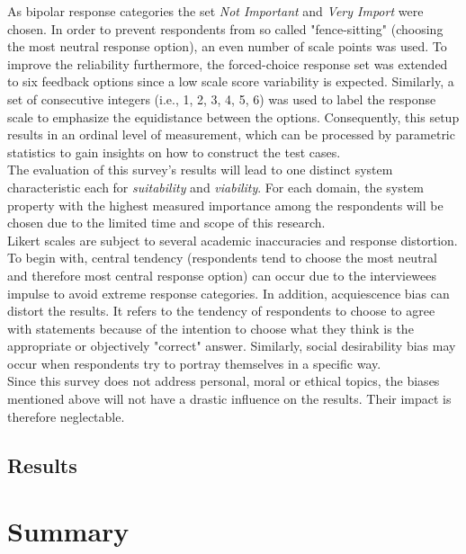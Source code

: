 As bipolar response categories the set \textit{Not Important} and \textit{Very Import} were chosen. In order to prevent respondents from so called "fence-sitting" (choosing the most neutral response option), an even number of scale points was used. To improve the reliability furthermore, the forced-choice response set was extended to six feedback options since a low scale score variability is expected.\autocite{Brill2008LikertScale} Similarly, a set of consecutive integers (i.e., 1, 2, 3, 4, 5, 6) was used to label the response scale to emphasize the equidistance between the options. Consequently, this setup results in an ordinal level of measurement, which can be processed by parametric statistics to gain insights on how to construct the test cases. \\
The evaluation of this survey's results will lead to one distinct system characteristic each for \textit{suitability} and \textit{viability}. For each domain, the system property with the highest measured importance among the respondents will be chosen due to the limited time and scope of this research. \\
Likert scales are subject to several academic inaccuracies and response distortion. To begin with, central tendency (respondents tend to choose the most neutral and therefore most central response option\autocite{Schumacker2013CentralDispersion}) can occur due to the interviewees impulse to avoid extreme response categories. In addition, acquiescence bias can distort the results. It refers to the tendency of respondents to choose to agree with statements because of the intention to choose what they think is the appropriate or objectively "correct" answer.\autocite{Costello2015AcquiescenceEducation}\highcomma\autocite{Aichholzer2015ControllingTests} Similarly, social desirability bias may occur when respondents try to portray themselves in a specific way.\autocite{Grimm2010SocialBias} \\
Since this survey does not address personal, moral or ethical topics, the biases mentioned above will not have a drastic influence on the results. Their impact is therefore neglectable. 


\subsection{Results}




\section{Summary}
